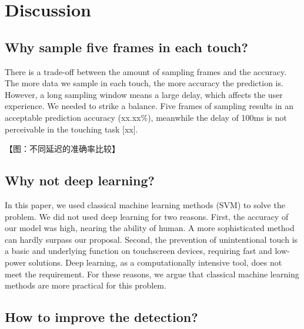 \section{Discussion}

\subsection{Why sample five frames in each touch?} There is a trade-off between the amount of sampling frames and the accuracy. The more data we sample in each touch, the more accuracy the prediction is. However, a long sampling window means a large delay, which affects the user experience. We needed to strike a balance. Five frames of sampling results in an acceptable prediction accuracy (xx.xx\%), meanwhile the delay of 100ms is not perceivable in the touching task [xx].

【图：不同延迟的准确率比较】

\subsection{Why not deep learning?}


In this paper, we used classical machine learning methods (SVM) to solve the problem. We did not used deep learning for two reasons. First, the accuracy of our model was high, nearing the ability of human. A more sophisticated method can hardly surpass our proposal. Second, the prevention of unintentional touch is a basic and underlying function on touchscreen devices, requiring fast and low-power solutions. Deep learning, as a computationally intensive tool, does not meet the requirement. For these reasons, we argue that classical machine learning methods are more practical for this problem.

\subsection{How to improve the detection?}

